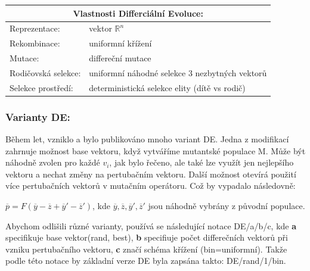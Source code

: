 \begin{center}
\begin{tabular}{ l l }
    \multicolumn{2}{c}{Vlastnosti Differciální Evoluce:} \\
    \hline \hline
    Reprezentace: & vektor $\mathbb{R}^n$ \\
    \hline  
    Rekombinace: & uniformní křížení \\
    \hline  
    Mutace: & differeční mutace \\
    \hline   
    Rodičovská selekce: & uniformní náhodné selekce 3 nezbytných vektorů \\
    \hline   
    Selekce prostředí: & deterministická selekce elity (dítě vs rodič) \\
  \end{tabular}
\end{center} \par
\subsubsection{Varianty DE:}
Během let, vzniklo a bylo publikováno mnoho variant DE. Jedna z modifikací zahrnuje možnost base vektoru, když vytváříme mutantské populace M. Může být náhodně zvolen pro každé $v_i$, jak bylo řečeno, ale také lze využít jen nejlepšího vektoru a nechat změny na pertubačním vektoru. Další možnost otevírá použití více pertubačních vektorů v mutačním operátoru. Což by vypadalo následovně: \par
$\overline{p} = F (\overline{y}-\overline{z} + \overline{y}' - \overline{z}')$, kde $\overline{y}, \overline{z}, \overline{y}',\overline{z}'$ jsou náhodně vybrány z původní populace.\par
Abychom odlišili různé varianty, používá se následující notace DE/a/b/c, kde \textbf{a} specifikuje base vektor(rand, best), \textbf{b} specifiuje počet differečních  vektorů při vzniku pertubačního vektoru, \textbf{c} značí schéma křížení (bin=uniformní). Takže podle této notace by základní verze DE byla zapsána takto: DE/rand/1/bin. 

